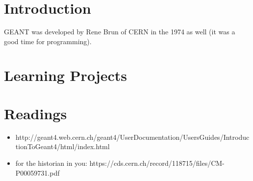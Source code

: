 \section{Introduction}
GEANT was developed by Rene Brun of CERN in the 1974 as well (it was a good time for programming).


\section{Learning Projects}


\section{Readings}
\begin{itemize}
\item http://geant4.web.cern.ch/geant4/UserDocumentation/UsersGuides/IntroductionToGeant4/html/index.html
  \item for the historian in you: https://cds.cern.ch/record/118715/files/CM-P00059731.pdf
\end{itemize}

